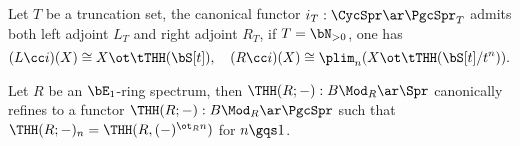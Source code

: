 \documentclass[article, a4paper, twoside]{universal}
\begin{document}


\begin{thm}
    Let $T$ be a truncation set, the canonical functor $i_{T}:\CycSpr\ar\PgcSpr_{T}$ admits both left adjoint $L_{T}$ and right adjoint $R_{T}$, if $T=\bN_{>0}$, one has
    \[
        (L\cc i)(X)\cong X\ot \tTHH(\bS[t]),\quad (R\cc i)(X)\cong \plim_{n}(X\ot\tTHH(\bS[t]/t^{n})).
    \]
\end{thm}

\begin{thm}
    Let $R$ be an $\bE_{1}$-ring spectrum, then $\THH(R;-):B\Mod_{R}\ar\Spr$ canonically refines to a functor $\THH(R;-):B\Mod_{R}\ar\PgcSpr$ such that $\THH(R;-)_{n}=\THH(R,(-)^{\ot_{R}n})$ for $n\gqs1$.
\end{thm}

\printref
\end{document}
